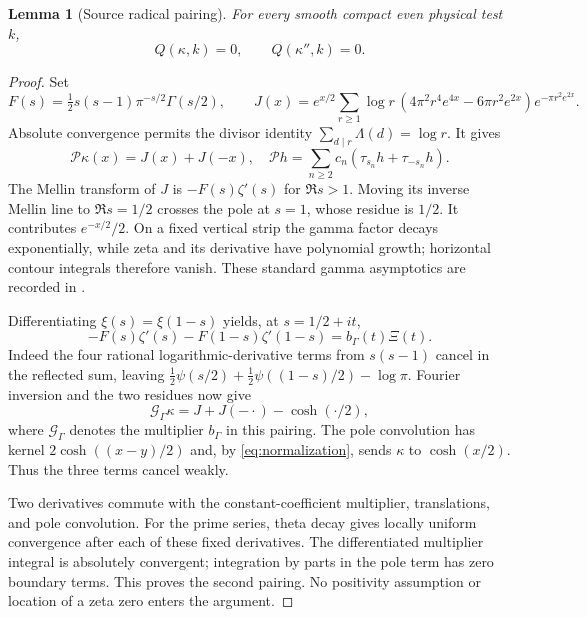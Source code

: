 \documentclass[11pt,a4paper]{article}
\numberwithin{equation}{section}
\newtheorem{lemma}[theorem]{Lemma}
\theoremstyle{definition}\newtheorem{definition}[theorem]{Definition}
\theoremstyle{remark}\newtheorem{remark}[theorem]{Remark}
\begin{document}
\begin{lemma}[Source radical pairing]\label{lem:radical}
For every smooth compact even physical test $k$,
\begin{equation}\label{eq:radical}
 Q(\kappa,k)=0,\qquad Q(\kappa'',k)=0.
\end{equation}
\end{lemma}
\begin{proof}
Set
\[
 F(s)=\tfrac12s(s-1)\pi^{-s/2}\Gamma(s/2),\qquad
 J(x)=e^{x/2}\sum_{r\ge1}\log r\,(4\pi^2r^4e^{4x}-6\pi r^2e^{2x})e^{-\pi r^2e^{2x}}.
\]
Absolute convergence permits the divisor identity $\sum_{d\mid r}\Lambda(d)=\log r$. It gives
\begin{equation}\label{eq:primekappa}
 \mathcal P\kappa(x)=J(x)+J(-x),\quad
 \mathcal Ph=\sum_{n\ge2}c_n(\tau_{s_n}h+\tau_{-s_n}h).
\end{equation}
The Mellin transform of $J$ is $-F(s)\zeta'(s)$ for $\Re s>1$. Moving its inverse Mellin line to $\Re s=1/2$ crosses the pole at $s=1$, whose residue is $1/2$. It contributes $e^{-x/2}/2$. On a fixed vertical strip the gamma factor decays exponentially, while zeta and its derivative have polynomial growth; horizontal contour integrals therefore vanish. These standard gamma asymptotics are recorded in \cite{nistasympt}.

Differentiating $\xi(s)=\xi(1-s)$ yields, at $s=1/2+it$,
\begin{equation}\label{eq:mellincancel}
 -F(s)\zeta'(s)-F(1-s)\zeta'(1-s)=b_\Gamma(t)\Xi(t).
\end{equation}
Indeed the four rational logarithmic-derivative terms from $s(s-1)$ cancel in the reflected sum, leaving
$\tfrac12\psi(s/2)+\tfrac12\psi((1-s)/2)-\log\pi$.
Fourier inversion and the two residues now give
\[
 \mathcal G_\Gamma\kappa=J+J(-\cdot)-\cosh(\cdot/2),
\]
where $\mathcal G_\Gamma$ denotes the multiplier $b_\Gamma$ in this pairing. The pole convolution has kernel $2\cosh((x-y)/2)$ and, by \eqref{eq:normalization}, sends $\kappa$ to $\cosh(x/2)$. Thus the three terms cancel weakly.

Two derivatives commute with the constant-coefficient multiplier, translations, and pole convolution. For the prime series, theta decay gives locally uniform convergence after each of these fixed derivatives. The differentiated multiplier integral is absolutely convergent; integration by parts in the pole term has zero boundary terms. This proves the second pairing. No positivity assumption or location of a zeta zero enters the argument.
\end{proof}
\end{document}
